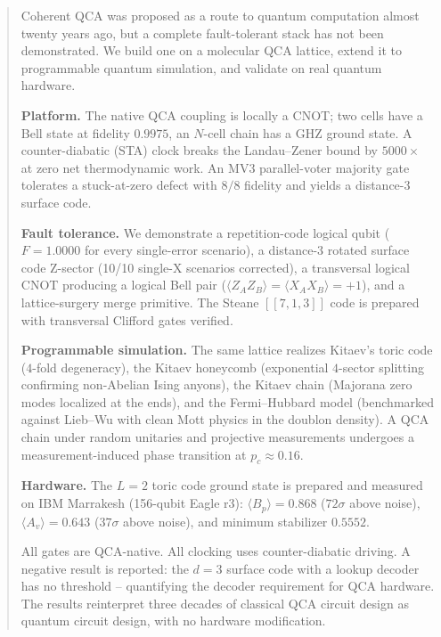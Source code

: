 \begin{abstract}
Coherent QCA was proposed as a route to quantum computation
almost twenty years ago, but a complete fault-tolerant stack
has not been demonstrated.  We build one on a molecular QCA
lattice, extend it to programmable quantum simulation, and
validate on real quantum hardware.

\textbf{Platform.}  The native QCA coupling is locally a
CNOT; two cells have a Bell state at fidelity $0.9975$, an
$N$-cell chain has a GHZ ground state.  A counter-diabatic
(STA) clock breaks the Landau--Zener bound by $5000\times$
at zero net thermodynamic work.  An MV3 parallel-voter
majority gate tolerates a stuck-at-zero defect with $8/8$
fidelity and yields a distance-3 surface code.

\textbf{Fault tolerance.}  We demonstrate a repetition-code
logical qubit ($F = 1.0000$ for every single-error scenario),
a distance-3 rotated surface code Z-sector (10/10 single-X
scenarios corrected), a transversal logical CNOT producing a
logical Bell pair ($\langle Z_A Z_B\rangle = \langle X_A X_B\rangle
= +1$), and a lattice-surgery merge primitive.  The Steane
$[[7,1,3]]$ code is prepared with transversal Clifford gates
verified.

\textbf{Programmable simulation.}  The same lattice realizes
Kitaev's toric code ($4$-fold degeneracy), the Kitaev
honeycomb (exponential $4$-sector splitting confirming
non-Abelian Ising anyons), the Kitaev chain (Majorana zero
modes localized at the ends), and the Fermi--Hubbard model
(benchmarked against Lieb--Wu with clean Mott physics in the
doublon density).  A QCA chain under random unitaries and
projective measurements undergoes a measurement-induced phase
transition at $p_c \approx 0.16$.

\textbf{Hardware.}  The $L=2$ toric code ground state is
prepared and measured on IBM Marrakesh (156-qubit Eagle r3):
$\langle B_p\rangle = 0.868$ ($72\sigma$ above noise),
$\langle A_v\rangle = 0.643$ ($37\sigma$ above noise), and
minimum stabilizer $0.5552$.

All gates are QCA-native.  All clocking uses counter-diabatic
driving.  A negative result is reported: the $d=3$ surface
code with a lookup decoder has no threshold -- quantifying
the decoder requirement for QCA hardware.  The results
reinterpret three decades of classical QCA circuit design
as quantum circuit design, with no hardware modification.
\end{abstract}
